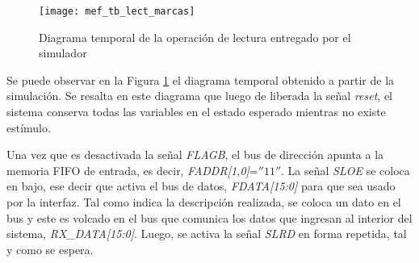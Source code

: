 %
%	
%
%
%
%
%		
%
%
%
%
%		

\begin{figure}[b]
	\centering
	\texttt{[image: mef\_tb\_lect\_marcas]}
	\caption{Diagrama temporal de la operación de lectura entregado por el simulador}
	\label{tb:lect}
\end{figure}

Se puede observar en la Figura \ref{tb:lect} el diagrama temporal obtenido a partir de la simulación. Se resalta en este diagrama que luego de liberada la señal \textit{reset}, el sistema conserva todas las variables en el estado esperado mientras no existe estímulo.

Una vez que es desactivada la señal {\it FLAGB}, el bus de dirección apunta a la memoria FIFO de entrada, es decir, {\it FADDR[1,0]}=$''11''$. La señal {\it SLOE} se coloca en bajo, ese decir que activa el bus de datos, {\it FDATA[15:0]} para que sea usado por la interfaz. Tal como indica la descripción realizada, se coloca un dato en el bus y este es volcado en el bus que comunica los datos que ingresan al interior del sistema, {\it RX\_DATA[15:0]}. Luego, se activa la señal {\it SLRD} en forma repetida, tal y como se espera.

